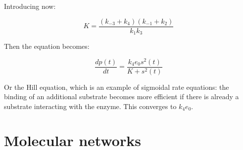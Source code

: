     Introducing now:

    $$K = \frac{(k_{-3} + k_4)(k_{-1} + k_2)}{k_1k_3}$$

    Then the equation becomes:

    $$\frac{dp(t)}{dt} = \frac{k_4e_0s^2(t)}{K + s^2(t)}$$

    Or the Hill equation, which is an example of sigmoidal rate equations: the binding of an additional substrate becomes more efficient if there is already a substrate interacting with the enzyme.
    This converges to $k_4e_0$.

\section{Molecular networks}











